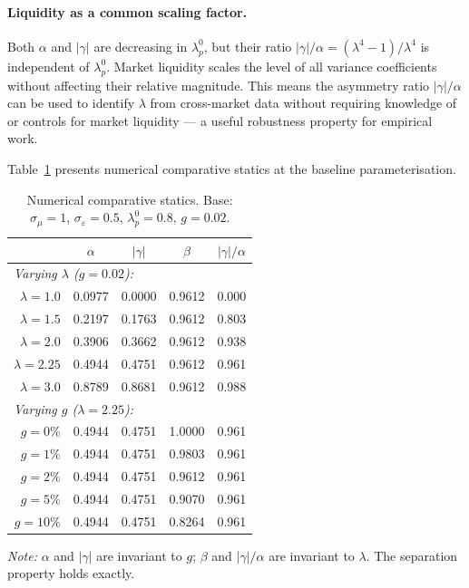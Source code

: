 \documentclass[12pt,a4paper]{article}
\theoremstyle{definition}
\begin{document}
\paragraph{Liquidity as a common scaling factor.}
Both $\alpha$ and $|\gamma|$ are decreasing in $\lambda^0_p$, but
their ratio $|\gamma|/\alpha = (\lambda^4-1)/\lambda^4$ is
independent of $\lambda^0_p$. Market liquidity scales the level of
all variance coefficients without affecting their relative magnitude.
This means the asymmetry ratio $|\gamma|/\alpha$ can be used to
identify $\lambda$ from cross-market data without requiring
knowledge of or controls for market liquidity --- a useful robustness
property for empirical work.

Table~\ref{tab:comp_statics} presents numerical comparative statics
at the baseline parameterisation.

\begin{table}[ht]
\centering
\caption{Numerical comparative statics. Base:
$\sigma_\mu=1$, $\sigma_\varepsilon=0.5$, $\lambda^0_p=0.8$,
$g=0.02$.}
\label{tab:comp_statics}
\begin{tabular}{r cccc}
\toprule
& $\alpha$ & $|\gamma|$ & $\beta$ & $|\gamma|/\alpha$ \\
\midrule
\multicolumn{5}{l}{\textit{Varying $\lambda$ ($g=0.02$):}} \\
$\lambda=1.0$ & 0.0977 & 0.0000 & 0.9612 & 0.000 \\
$\lambda=1.5$ & 0.2197 & 0.1763 & 0.9612 & 0.803 \\
$\lambda=2.0$ & 0.3906 & 0.3662 & 0.9612 & 0.938 \\
$\lambda=2.25$& 0.4944 & 0.4751 & 0.9612 & 0.961 \\
$\lambda=3.0$ & 0.8789 & 0.8681 & 0.9612 & 0.988 \\
\midrule
\multicolumn{5}{l}{\textit{Varying $g$ ($\lambda=2.25$):}} \\
$g=0\%$  & 0.4944 & 0.4751 & 1.0000 & 0.961 \\
$g=1\%$  & 0.4944 & 0.4751 & 0.9803 & 0.961 \\
$g=2\%$  & 0.4944 & 0.4751 & 0.9612 & 0.961 \\
$g=5\%$  & 0.4944 & 0.4751 & 0.9070 & 0.961 \\
$g=10\%$ & 0.4944 & 0.4751 & 0.8264 & 0.961 \\
\bottomrule
\end{tabular}
\medskip

\noindent\footnotesize{\textit{Note:} $\alpha$ and $|\gamma|$ are
invariant to $g$; $\beta$ and $|\gamma|/\alpha$ are invariant to
$\lambda$. The separation property holds exactly.}
\end{table}
\end{document}
